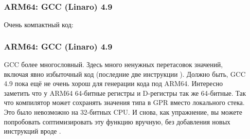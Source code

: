 \fi

\subsubsection{ARM64: \Optimizing GCC (Linaro) 4.9}

Очень компактный код:



\subsubsection{ARM64: \NonOptimizing GCC (Linaro) 4.9}



\NonOptimizing GCC более многословный.
Здесь много ненужных перетасовок значений, включая явно избыточный код 
(последние две инструкции ).
Должно быть, GCC 4.9 пока ещё не очень хорош для генерации кода под ARM64.
Интересно заметить что у ARM64 64-битные регистры и D-регистры так же 64-битные.
Так что компилятор может сохранять значения типа \Tdouble в \ac{GPR} вместо локального стека.
Это было невозможно на 32-битных CPU.
И снова, как упражнение, вы можете попробовать соптимизировать эту функцию вручную, без добавления
новых инструкций вроде .

